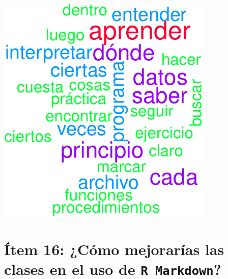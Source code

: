 \documentclass[
]{article}
\newenvironment{Shaded}{\begin{snugshade}}{\end{snugshade}}
\newcommand{\CommentTok}[1]{\textcolor[rgb]{0.56,0.35,0.01}{\textit{#1}}}
\newcommand{\NormalTok}[1]{#1}
\newcommand{\SpecialCharTok}[1]{\textcolor[rgb]{0.81,0.36,0.00}{\textbf{#1}}}
\begin{document}
\includegraphics{informe_files/figure-latex/unnamed-chunk-16-1.pdf}

\hypertarget{uxedtem-16-cuxf3mo-mejoraruxedas-las-clases-en-el-uso-de}{%
\section{\texorpdfstring{Ítem 16: ¿Cómo mejorarías las clases en el uso
de
\texttt{R Markdown}?}{Ítem 16: ¿Cómo mejorarías las clases en el uso de ?}}\label{uxedtem-16-cuxf3mo-mejoraruxedas-las-clases-en-el-uso-de}}

\begin{Shaded}
\end{Shaded}
\end{document}
